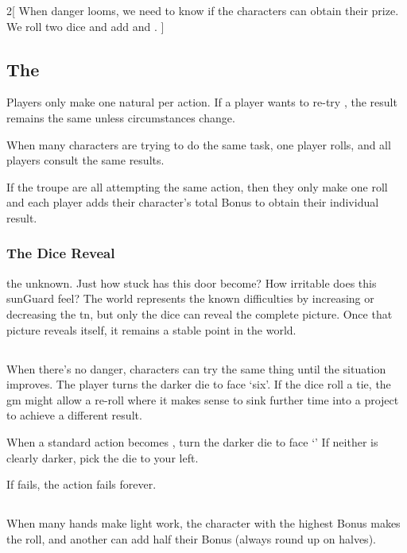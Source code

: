\begin{multicols}{2}[%
  \noindent%
  When danger looms, we need to know if the characters can obtain their prize.
  We roll two dice and add  and .
]
\subsection{The }

Players only make one \gls{natural} per \gls{action}.
If a player wants to re-try , the result remains the same unless circumstances change.

When many characters are trying to do the same task, one player rolls, and all players consult the same results.

If the troupe are all attempting the same action, then they only make one roll and each player adds their character's total Bonus to obtain their individual result.

\subsubsection{The Dice Reveal}
the unknown.
Just how stuck has this door become?
How irritable does this \gls{sunGuard} feel?
The world represents the known difficulties by increasing or decreasing the \gls{tn}, but only the dice can reveal the complete picture.
Once that picture reveals itself, it remains a stable point in the world.

\subsection{}
\label{restingactions}

When there's no danger, characters can try the same thing until the situation improves.
The player turns the darker die to face `six'.
If the dice roll a tie, the \gls{gm} might allow a re-roll where it makes sense to sink further time into a project to achieve a different result.

When a standard \gls{action} becomes , turn the darker die to face `'
If neither is clearly darker, pick the die to your left.

If  fails, the \gls{action} fails forever.

\subsection{}
\label{teamwork}
\label{banding}

When many hands make light work, the character with the highest Bonus makes the roll, and another can add half their Bonus (always round up on halves).


\end{multicols}
